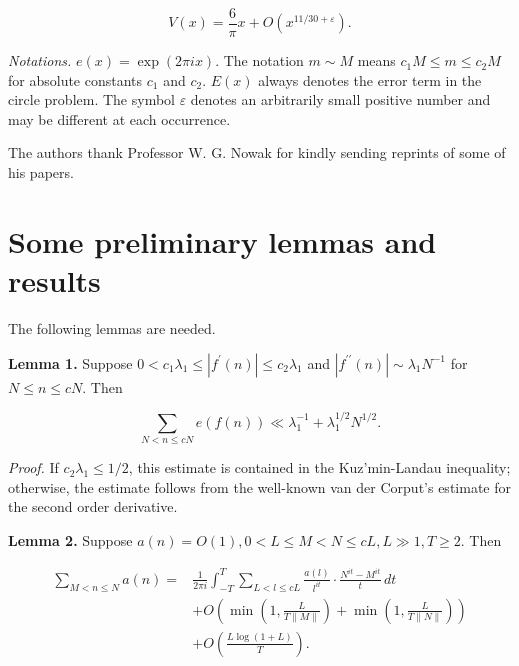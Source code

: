 \documentclass[10pt]{article}
\begin{document}
\begin{equation*}
V(x)=\frac{6}{\pi}x+O\left(x^{11/30+\varepsilon}\right). \tag{1.4}
\end{equation*}

\noindent\textit{Notations.}
$e(x)=\exp(2\pi i x)$. The notation $m\sim M$ means
$c_{1}M\leq m\leq c_{2}M$ for absolute constants $c_{1}$ and $c_{2}$.
$E(x)$ always denotes the error term in the circle problem.
The symbol $\varepsilon$ denotes an arbitrarily small positive number and may
be different at each occurrence.

\begingroup
\renewcommand{\thefootnote}{}
\addtocounter{footnote}{-1}
\endgroup

The authors thank Professor W. G. Nowak for kindly sending reprints of some of
his papers.

\section{Some preliminary lemmas and results}
The following lemmas are needed.

\medskip\noindent\textbf{Lemma 1.} Suppose $0<c_{1} \lambda_{1} \leq\left|f^{\prime}(n)\right| \leq c_{2} \lambda_{1}$ and $\left|f^{\prime \prime}(n)\right| \sim \lambda_{1} N^{-1}$ for $N \leq n \leq c N$. Then

$$
\sum_{N<n \leq c N} e(f(n)) \ll \lambda_{1}^{-1}+\lambda_{1}^{1 / 2} N^{1 / 2}.
$$

\smallskip\noindent\textit{Proof.} If $c_{2} \lambda_{1} \leq 1 / 2$, this estimate is contained in the Kuz'min-Landau inequality; otherwise, the estimate follows from the well-known van der Corput's estimate for the second order derivative.

\medskip\noindent\textbf{Lemma 2.} Suppose $a(n)=O(1), 0<L \leq M<N \leq c L, L \gg 1, T \geq 2$. Then

$$
\begin{aligned}
\sum_{M<n \leq N} a(n)= & \frac{1}{2 \pi i} \int_{-T}^{T} \sum_{L<l \leq c L} \frac{a(l)}{l^{i t}} \cdot \frac{N^{i t}-M^{i t}}{t} \, d t \\
& +O\left(\min \left(1, \frac{L}{T\|M\|}\right)+\min \left(1, \frac{L}{T\|N\|}\right)\right) \\
& +O\left(\frac{L \log(1+L)}{T}\right).
\end{aligned}
$$
\end{document}

